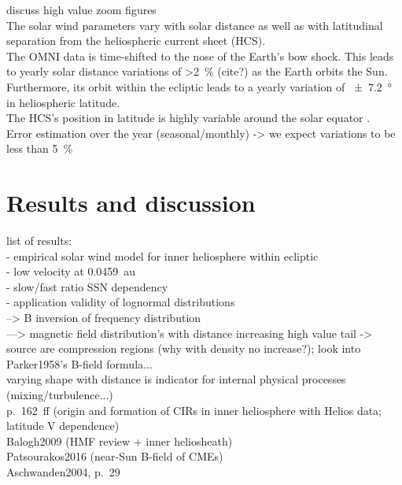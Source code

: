 discuss high value zoom figures\\

The solar wind parameters vary with solar distance as well as with latitudinal separation from the heliospheric current sheet (HCS).\\
The OMNI data is time-shifted to the nose of the Earth's bow shock. This leads to yearly solar distance variations of \SI{>2}{\percent} (cite?) as the Earth orbits the Sun. Furthermore, its orbit within the ecliptic leads to a yearly variation of \SI{+-7.2}{\degree} in heliospheric latitude.\\
The HCS's position in latitude is highly variable around the solar equator \citep[p.~127~ff.?]{Schwenn1990}.\\

Error estimation over the year (seasonal/monthly) -> we expect variations to be less than 5~\%\\





\section{Results and discussion}

list of results:\\
- empirical solar wind model for inner heliosphere within ecliptic\\
- low velocity at 0.0459~au\\
- slow/fast ratio SSN dependency\\
- application validity of lognormal distributions\\
--> B inversion of frequency distribution\\
---> magnetic field distribution's with distance increasing high value tail -> source are compression regions (why with density no increase?); look into Parker1958's B-field formula...\\
varying shape with distance is indicator for internal physical processes (mixing/turbulence...)\\

\citet{Balogh1999} p.~162~ff (origin and formation of CIRs in inner heliosphere with Helios data; latitude V dependence)\\
Balogh2009 (HMF review + inner heliosheath)\\
Patsourakos2016 (near-Sun B-field of CMEs)\\
Aschwanden2004, p.~29\\

